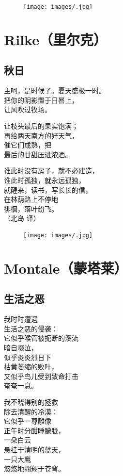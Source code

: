 \documentclass[]{book}
\renewenvironment{quote}{\begin{VF}}{\end{VF}}
\begin{document}
\begin{figure}[htbp]
\centering
\texttt{[image: images/.jpg]}
\caption{}
\end{figure}

\chapter{Rilke（里尔克）}\label{rilke}

\section{秋日}

\begin{quote}
主呵，是时候了。夏天盛极一时。\\
把你的阴影置于日晷上，\\
让风吹过牧场。

让枝头最后的果实饱满；\\
再给两天南方的好天气，\\
催它们成熟，把\\
最后的甘甜压进浓酒。

谁此时没有房子，就不必建造，\\
谁此时孤独，就永远孤独，\\
就醒来，读书，写长长的信，\\
在林荫路上不停地\\
徘徊，落叶纷飞。\\
（北岛 译）
\end{quote}

\begin{figure}[htbp]
\centering
\texttt{[image: images/.jpg]}
\caption{}
\end{figure}

\chapter{Montale（蒙塔莱）}\label{montale}

\section{生活之恶}

\begin{quote}
我时时遭遇\\
生活之恶的侵袭：\\
它似乎喉管被扼断的溪流\\
暗自啜泣，\\
似乎炎炎烈日下\\
枯黄萎缩的败叶，\\
又似乎鸟儿受到致命打击\\
奄奄一息。

我不晓得别的拯救\\
除去清醒的冷漠：\\
它似乎一尊雕像\\
正午时分酣睡朦胧，\\
一朵白云\\
悬挂于清明的蓝天，\\
一只大鹰\\
悠悠地翱翔于苍穹。
\end{quote}
\end{document}

